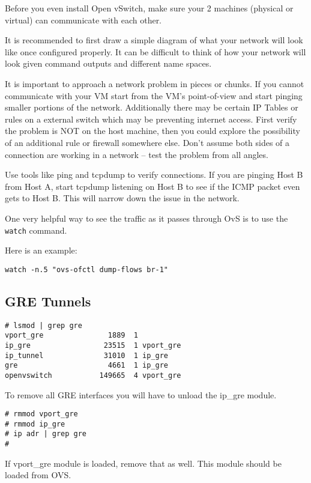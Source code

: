 \documentclass[letter]{article}
\begin{document}
{{\begin{appendices}
Before you even install Open vSwitch, make sure your 2 machines (physical or virtual) can communicate with each other.

It is recommended to first draw a simple diagram of what your network will look like once configured properly. 
It can be difficult to think of how your network will look given command outputs and different name spaces.

It is important to approach a network problem in pieces or chunks. 
If you cannot communicate with your VM start from the VM's point-of-view and start pinging smaller portions of the network. 
Additionally there may be certain IP Tables or rules on a external switch which may be preventing internet access.
First verify the problem is NOT on the host machine, then you could explore the possibility of an additional rule or firewall somewhere else. 
Don't assume both sides of a connection are working in a network – test the problem from all angles.

Use tools like ping and tcpdump to verify connections. If you are pinging Host B from Host A, start tcpdump listening on Host B to see if the ICMP packet even gets to Host B. This will narrow down the issue in the network.

One very helpful way to see the traffic as it passes through OvS is to use the \texttt{watch} command. 

Here is an example:
\begin{lstlisting}
watch -n.5 "ovs-ofctl dump-flows br-1"
\end{lstlisting}


\subsection{GRE Tunnels}
\label{appendix:gre}

\begin{lstlisting}
# lsmod | grep gre
vport_gre               1889  1 
ip_gre                 23515  1 vport_gre
ip_tunnel              31010  1 ip_gre
gre                     4661  1 ip_gre
openvswitch           149665  4 vport_gre
\end{lstlisting}

To remove all GRE interfaces you will have to unload the ip\_gre module.

\begin{lstlisting}
# rmmod vport_gre
# rmmod ip_gre
# ip adr | grep gre
#
\end{lstlisting}

If vport\_gre module is loaded, remove that as well. This module should be loaded from OVS.


\end{appendices}}}
\end{document}
